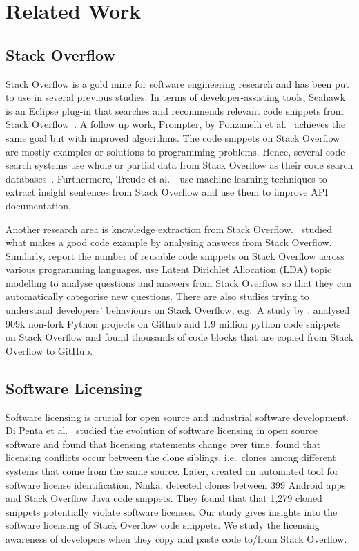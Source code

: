 \documentclass{svjour3}                     %
\begin{document}
\section{Related Work}

\subsection{Stack Overflow}

Stack Overflow is a gold mine for software engineering research and has been put
to use in several previous studies. In terms of developer-assisting tools,
Seahawk is an Eclipse plug-in that searches and recommends relevant code
snippets from Stack Overflow~\citep{Ponzanelli2013}. A follow up work, Prompter,
by Ponzanelli et al.~\citep{Ponzanelli2014} achieves the same goal but with
improved algorithms. The code snippets on Stack Overflow are mostly examples or
solutions to programming problems. Hence, several code search systems use whole
or partial data from Stack Overflow as their code search
databases~\citep{Keivanloo2014,Park2014,
	Stolee2014,Subramanian2013,Diamantopoulos2015}. Furthermore, Treude et
al.~\cite{Treude2016}~use machine learning techniques to extract insight
sentences from Stack Overflow and use them to improve API documentation.

Another research area is knowledge extraction from Stack Overflow.
\cite{Nasehi2012}~studied what makes a good code example by analysing answers
from Stack Overflow. Similarly, \cite{Yang2016} report the number of reusable
code snippets on Stack Overflow across various programming languages.
\cite{Wang2013_StackOverflow} use Latent Dirichlet Allocation (LDA) topic
modelling to analyse questions and answers from Stack Overflow so that they can
automatically categorise new questions. There are also studies trying to
understand developers' behaviours on Stack Overflow, e.g.~A study by
\cite{Movshovitz-Attias2013,Rosen2016,Choetkiertikul2015,Bosu2013}.
\cite{Yang2017} analysed 909k non-fork Python projects on Github and 1.9
million python code snippets on Stack Overflow and found thousands of 
code blocks that are copied from Stack Overflow to GitHub.

\subsection{Software Licensing}
Software licensing is crucial for open source and industrial software
development. Di Penta et al.~\cite{DiPenta2010} studied the evolution of
software licensing in open source software and found that licensing statements
change over time. \cite{German2009} found that licensing conflicts occur between
the clone siblings, i.e.~clones among different systems that come from the same
source. Later, \cite{German2010} created an automated tool for software license
identification, Ninka. \cite{An2017} detected clones between 399 Android apps
and Stack Overflow Java code snippets. They found that  that 1,279 cloned
snippets potentially violate software licenses. Our study gives insights into
the software licensing of Stack Overflow code snippets. We study the licensing
awareness of developers when they copy and paste code to/from Stack Overflow.
\end{document}
